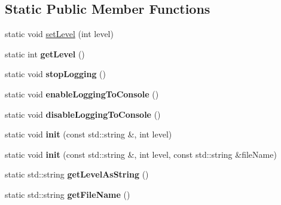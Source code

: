 \subsection*{Static Public Member Functions}
\begin{DoxyCompactItemize}
\item 
static void \hyperlink{classrr_1_1_logger_ade065fdfd77c968b1f3474294d0ea436}{set\-Level} (int level)
\item 
\hypertarget{classrr_1_1_logger_ad6b48d767c766eeb3db7505a59631b6b}{static int {\bfseries get\-Level} ()}\label{classrr_1_1_logger_ad6b48d767c766eeb3db7505a59631b6b}

\item 
\hypertarget{classrr_1_1_logger_a8861de824ed5c3ea594de160625f8b0b}{static void {\bfseries stop\-Logging} ()}\label{classrr_1_1_logger_a8861de824ed5c3ea594de160625f8b0b}

\item 
\hypertarget{classrr_1_1_logger_abb5401450cbad3945d236b5e9618bc46}{static void {\bfseries enable\-Logging\-To\-Console} ()}\label{classrr_1_1_logger_abb5401450cbad3945d236b5e9618bc46}

\item 
\hypertarget{classrr_1_1_logger_a6a1effdf67e5eef211a19a3d02750f3e}{static void {\bfseries disable\-Logging\-To\-Console} ()}\label{classrr_1_1_logger_a6a1effdf67e5eef211a19a3d02750f3e}

\item 
\hypertarget{classrr_1_1_logger_a3971b2ac513966db2fdea5850552dffa}{static void {\bfseries init} (const std\-::string \&, int level)}\label{classrr_1_1_logger_a3971b2ac513966db2fdea5850552dffa}

\item 
\hypertarget{classrr_1_1_logger_a2446b1035fcda81d59a03594d05a8937}{static void {\bfseries init} (const std\-::string \&, int level, const std\-::string \&file\-Name)}\label{classrr_1_1_logger_a2446b1035fcda81d59a03594d05a8937}

\item 
\hypertarget{classrr_1_1_logger_ad74d2f166bb88e76c082d35878e061b1}{static std\-::string {\bfseries get\-Level\-As\-String} ()}\label{classrr_1_1_logger_ad74d2f166bb88e76c082d35878e061b1}

\item 
\hypertarget{classrr_1_1_logger_a40f208d7bf2af73894ba3872296dbe9c}{static std\-::string {\bfseries get\-File\-Name} ()}\label{classrr_1_1_logger_a40f208d7bf2af73894ba3872296dbe9c}

\end{DoxyCompactItemize}


